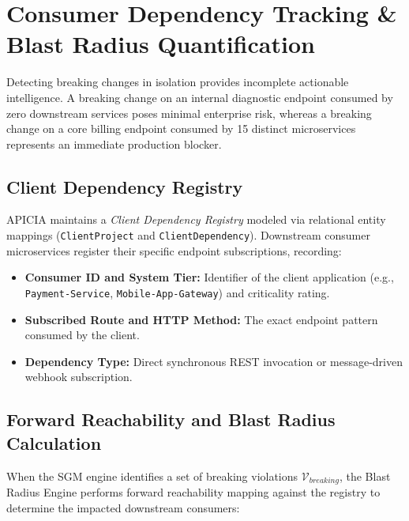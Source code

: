 \documentclass[conference]{IEEEtran}
\begin{document}
\section{Consumer Dependency Tracking \& Blast Radius Quantification}
\label{sec:blast_radius}

Detecting breaking changes in isolation provides incomplete actionable intelligence. A breaking change on an internal diagnostic endpoint consumed by zero downstream services poses minimal enterprise risk, whereas a breaking change on a core billing endpoint consumed by 15 distinct microservices represents an immediate production blocker.

\subsection{Client Dependency Registry}
APICIA maintains a \textit{Client Dependency Registry} modeled via relational entity mappings (\texttt{ClientProject} and \texttt{ClientDependency}). Downstream consumer microservices register their specific endpoint subscriptions, recording:
\begin{itemize}
    \item \textbf{Consumer ID and System Tier:} Identifier of the client application (e.g., \texttt{Payment-Service}, \texttt{Mobile-App-Gateway}) and criticality rating.
    \item \textbf{Subscribed Route and HTTP Method:} The exact endpoint pattern consumed by the client.
    \item \textbf{Dependency Type:} Direct synchronous REST invocation or message-driven webhook subscription.
\end{itemize}

\subsection{Forward Reachability and Blast Radius Calculation}
When the SGM engine identifies a set of breaking violations $\mathcal{V}_{breaking}$, the Blast Radius Engine performs forward reachability mapping against the registry to determine the impacted downstream consumers:
\end{document}
